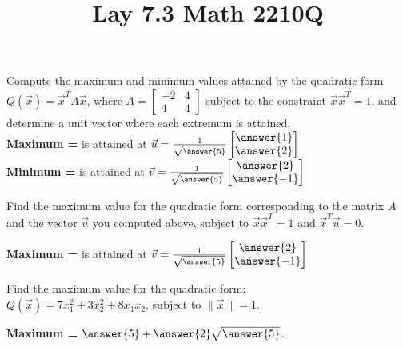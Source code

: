 \documentclass{ximera}
\begin{document}
  	\title{Lay 7.3  \hfill Math 2210Q} 
  	
  	\begin{question} 
  		Compute the maximum and minimum values attained by the quadratic form
		$Q(\vec{x})= \vec{x}^TA\vec{x}$, where $A = \begin{bmatrix}
		-2&4\\4&4\end{bmatrix}$ subject to the constraint $\vec{x}\vec{x}^{T} = 1$,
		and determine a unit vector where each extremum is attained.  
\vspace{10pt}\\
  	 
\textbf{Maximum = }  is attained at $\vec{u} = \frac{1}{\sqrt{\answer{5}}}\begin{bmatrix}
\answer{1} \\  \answer{2}\end{bmatrix}$\\
\textbf{Minimum = }  is attained at $\vec{v}= \frac{1}{\sqrt{\answer{5}}}\begin{bmatrix}
\answer{2} \\  \answer{-1}
\end{bmatrix}$
\\ 
  		

  		
  	\end{question}
  	\begin{question} 
  		Find the maximum value for the quadratic form corresponding to the matrix
		$A$ and the vector $\vec{u}$ you computed above, subject to
		$\vec{x}\vec{x}^{T}=1$ and $\vec{x}^{T}\vec{u}=0$. 

\textbf{Maximum = }  is attained at $\vec{v}= \frac{1}{\sqrt{\answer{5}}}\begin{bmatrix}
\answer{2} \\  \answer{-1}
\end{bmatrix}$
\\ 
		
    	
  	\end{question}
  	\begin{question} 
  		Find the maximum value for the quadratic form:\\ $Q(\vec{x}) = 7x_1^2
		+3x_2^2  +8x_1x_2 $, subject to $\| \vec{x}\| =1$. 

\textbf{Maximum = } $\answer{5}+\answer{2}\sqrt{\answer{5}}$.  
\\ 
		
 	
  	\end{question}
\end{document}
